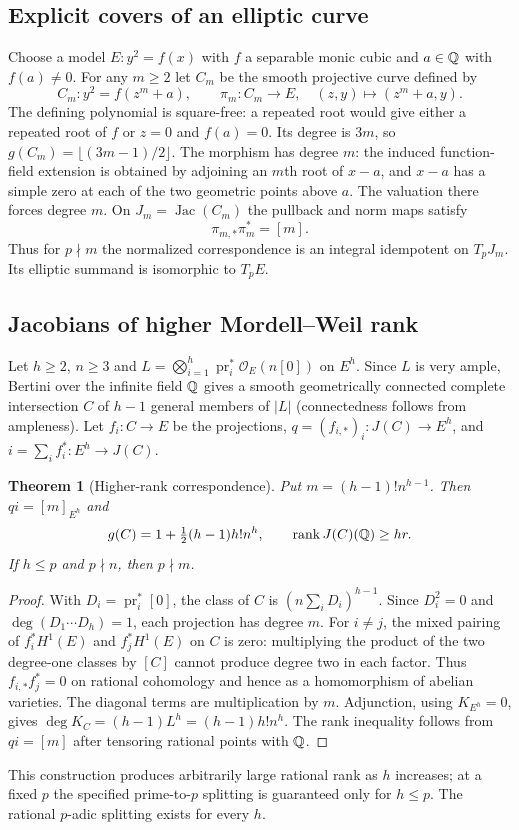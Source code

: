\documentclass[11pt,a4paper]{article}
\newtheorem{theorem}{Theorem}[section]\newtheorem{proposition}[theorem]{Proposition}\newtheorem{corollary}[theorem]{Corollary}\theoremstyle{definition}\newtheorem{definition}[theorem]{Definition}\newtheorem{remark}[theorem]{Remark}
\begin{document}
\subsection{Explicit covers of an elliptic curve}
Choose a model $E:y^2=f(x)$ with $f$ a separable monic cubic and $a\in\mathbb Q$ with $f(a)\ne0$. For any $m\geq2$ let $C_m$ be the smooth projective curve defined by
\[
 C_m:y^2=f(z^m+a),\qquad \pi_m:C_m\longrightarrow E,\quad (z,y)\mapsto(z^m+a,y).
\]
The defining polynomial is square-free: a repeated root would give either a repeated root of $f$ or $z=0$ and $f(a)=0$. Its degree is $3m$, so $g(C_m)=\lfloor(3m-1)/2\rfloor$. The morphism has degree $m$: the induced function-field extension is obtained by adjoining an $m$th root of $x-a$, and $x-a$ has a simple zero at each of the two geometric points above $a$. The valuation there forces degree $m$. On $J_m=\operatorname{Jac}(C_m)$ the pullback and norm maps satisfy
\begin{equation}\label{eq:norm}
\pi_{m,*}\pi_m^*=[m].
\end{equation}
Thus for $p\nmid m$ the normalized correspondence is an integral idempotent on $T_pJ_m$. Its elliptic summand is isomorphic to $T_pE$.

\subsection{Jacobians of higher Mordell--Weil rank}
Let $h\geq2$, $n\geq3$ and $L=\bigotimes_{i=1}^h \operatorname{pr}_i^*\mathcal O_E(n[0])$ on $E^h$. Since $L$ is very ample, Bertini over the infinite field $\mathbb Q$ gives a smooth geometrically connected complete intersection $C$ of $h-1$ general members of $|L|$ (connectedness follows from ampleness). Let $f_i:C\to E$ be the projections, $q=(f_{i,*})_i:J(C)\to E^h$, and $i=\sum_i f_i^*:E^h\to J(C)$.
\begin{theorem}[Higher-rank correspondence]\label{thm:geo}
Put $m=(h-1)!n^{h-1}$. Then $qi=[m]_{E^h}$ and
\[
g(C)=1+\tfrac12(h-1)h!n^h,\qquad \operatorname{rank} J(C)(\mathbb Q)\geq hr.
\]
If $h\leq p$ and $p\nmid n$, then $p\nmid m$.
\end{theorem}
\begin{proof}
With $D_i=\operatorname{pr}_i^*[0]$, the class of $C$ is $(n\sum_iD_i)^{h-1}$. Since $D_i^2=0$ and $\deg(D_1\cdots D_h)=1$, each projection has degree $m$. For $i\ne j$, the mixed pairing of $f_i^*H^1(E)$ and $f_j^*H^1(E)$ on $C$ is zero: multiplying the product of the two degree-one classes by $[C]$ cannot produce degree two in each factor. Thus $f_{i,*}f_j^*=0$ on rational cohomology and hence as a homomorphism of abelian varieties. The diagonal terms are multiplication by $m$. Adjunction, using $K_{E^h}=0$, gives $\deg K_C=(h-1)L^h=(h-1)h!n^h$. The rank inequality follows from $qi=[m]$ after tensoring rational points with $\mathbb Q$.
\end{proof}
This construction produces arbitrarily large rational rank as $h$ increases; at a fixed $p$ the specified prime-to-$p$ splitting is guaranteed only for $h\leq p$. The rational $p$-adic splitting exists for every $h$.
\newpage
\end{document}
